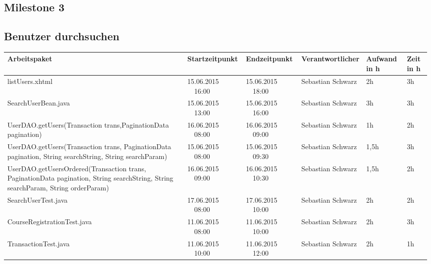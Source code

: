 \begin{landscape}
	\section{Milestone 3}	
	
	\subsection{Benutzer durchsuchen}
	\begin{tabular}{|p{10.3cm}|p{3.2cm}|p{3.2cm}|p{3.5cm}|p{1.7cm}|p{1.5cm}|}
		\hline  \textbf{Arbeitspaket} & \textbf{Startzeitpunkt} & \textbf{Endzeitpunkt} & \textbf{Verantwortlicher}  & \textbf{Aufwand in h} & \textbf{Zeit in h}\\ 
		\hline   listUsers.xhtml                                               & 15.06.2015 \ \ 16:00       & 15.06.2015 \ \ 18:00      & Sebastian Schwarz  & 2h       & 3h\\  
		\hline   SearchUserBean.java                                           & 15.06.2015 \ \ 13:00       & 15.06.2015 \ \ 16:00        & Sebastian Schwarz & 3h                 & 3h\\  
		\hline   UserDAO.getUsers(Transaction trans,PaginationData pagination) & 16.06.2015 \ \ 08:00       & 16.06.2015 \ \ 09:00        & Sebastian Schwarz & 1h                 & 2h\\  
		\hline   UserDAO.getUsers(Transaction trans, PaginationData pagination, String searchString, String searchParam) & 15.06.2015 \ \ 08:00       & 15.06.2015 \ \ 09:30       & Sebastian Schwarz  & 1,5h                 & 3h\\  
		\hline   UserDAO.getUsersOrdered(Transaction trans, PaginationData pagination, String searchString, String searchParam, String orderParam)    & 16.06.2015 \ \ 09:00       & 16.06.2015 \ \ 10:30 & Sebastian Schwarz & 1,5h                 & 2h\\  
		\hline SearchUserTest.java      &   17.06.2015 \ \ 08:00         &  17.06.2015 \ \ 10:00          & Sebastian Schwarz &        2h           &  2h\\  
		\hline   CourseRegistrationTest.java &  11.06.2015 \ \ 08:00       & 11.06.2015 \ \ 10:00       & Sebastian Schwarz   & 2h                 & 3h\\  
		\hline   TransactionTest.java    &  11.06.2015 \ \ 10:00       & 11.06.2015 \ \ 12:00           & Sebastian Schwarz   & 2h                 & 1h\\  
	

\end{tabular}
\end{landscape}
